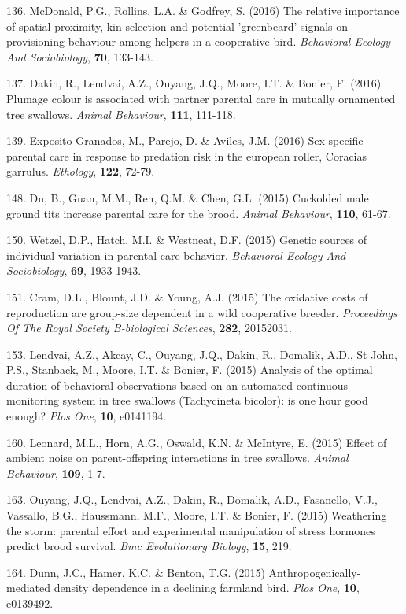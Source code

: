 136. McDonald, P.G., Rollins, L.A. \&  Godfrey, S. (2016) The relative importance of spatial proximity, kin selection and potential 'greenbeard' signals on provisioning behaviour among helpers in a cooperative bird. \textit{Behavioral Ecology And Sociobiology},  \textbf{70}, 133-143.

137. Dakin, R., Lendvai, A.Z., Ouyang, J.Q., Moore, I.T. \&  Bonier, F. (2016) Plumage colour is associated with partner parental care in mutually ornamented tree swallows. \textit{Animal Behaviour},  \textbf{111}, 111-118.

139. Exposito-Granados, M., Parejo, D. \&  Aviles, J.M. (2016) Sex-specific parental care in response to predation risk in the european roller, Coracias garrulus. \textit{Ethology},  \textbf{122}, 72-79.

148. Du, B., Guan, M.M., Ren, Q.M. \&  Chen, G.L. (2015) Cuckolded male ground tits increase parental care for the brood. \textit{Animal Behaviour},  \textbf{110}, 61-67.

150. Wetzel, D.P., Hatch, M.I. \&  Westneat, D.F. (2015) Genetic sources of individual variation in parental care behavior. \textit{Behavioral Ecology And Sociobiology},  \textbf{69}, 1933-1943.

151. Cram, D.L., Blount, J.D. \&  Young, A.J. (2015) The oxidative costs of reproduction are group-size dependent in a wild cooperative breeder. \textit{Proceedings Of The Royal Society B-biological Sciences},  \textbf{282}, 20152031.

153. Lendvai, A.Z., Akcay, C., Ouyang, J.Q., Dakin, R., Domalik, A.D., St John, P.S., Stanback, M., Moore, I.T. \&  Bonier, F. (2015) Analysis of the optimal duration of behavioral observations based on an automated continuous monitoring system in tree swallows (Tachycineta bicolor): is one hour good enough? \textit{Plos One},  \textbf{10}, e0141194.

160. Leonard, M.L., Horn, A.G., Oswald, K.N. \&  McIntyre, E. (2015) Effect of ambient noise on parent-offspring interactions in tree swallows. \textit{Animal Behaviour},  \textbf{109}, 1-7.

163. Ouyang, J.Q., Lendvai, A.Z., Dakin, R., Domalik, A.D., Fasanello, V.J., Vassallo, B.G., Haussmann, M.F., Moore, I.T. \&  Bonier, F. (2015) Weathering the storm: parental effort and experimental manipulation of stress hormones predict brood survival. \textit{Bmc Evolutionary Biology},  \textbf{15}, 219.

164. Dunn, J.C., Hamer, K.C. \&  Benton, T.G. (2015) Anthropogenically-mediated density dependence in a declining farmland bird. \textit{Plos One},  \textbf{10}, e0139492.


